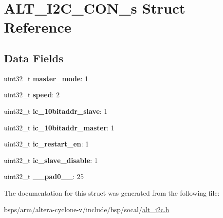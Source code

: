 \hypertarget{structALT__I2C__CON__s}{}\section{A\+L\+T\+\_\+\+I2\+C\+\_\+\+C\+O\+N\+\_\+s Struct Reference}
\label{structALT__I2C__CON__s}
\subsection*{Data Fields}
\begin{DoxyCompactItemize}
\item 
\mbox{\label{structALT__I2C__CON__s_adaf6b8d0719f32b789cf86f8646d826a}} 
uint32\+\_\+t {\bfseries master\+\_\+mode}\+: 1
\item 
\mbox{\label{structALT__I2C__CON__s_a8f0bcf93c2d296f9950137e7461b5cda}} 
uint32\+\_\+t {\bfseries speed}\+: 2
\item 
\mbox{\label{structALT__I2C__CON__s_a58046a9ebf05bc591433ba9f84b34a2a}} 
uint32\+\_\+t {\bfseries ic\+\_\+10bitaddr\+\_\+slave}\+: 1
\item 
\mbox{\label{structALT__I2C__CON__s_afe18a5780643bbc074b2d28fe41c19fc}} 
uint32\+\_\+t {\bfseries ic\+\_\+10bitaddr\+\_\+master}\+: 1
\item 
\mbox{\label{structALT__I2C__CON__s_aeeb8bd4a07ff1e2fa544bc58a1a0398c}} 
uint32\+\_\+t {\bfseries ic\+\_\+restart\+\_\+en}\+: 1
\item 
\mbox{\label{structALT__I2C__CON__s_af79100ce99385f60e8e5d268c51c9caf}} 
uint32\+\_\+t {\bfseries ic\+\_\+slave\+\_\+disable}\+: 1
\item 
\mbox{\label{structALT__I2C__CON__s_a7779951f060ce70be864d88c9b7006c6}} 
uint32\+\_\+t {\bfseries \+\_\+\+\_\+pad0\+\_\+\+\_\+}\+: 25
\end{DoxyCompactItemize}


The documentation for this struct was generated from the following file\+:\begin{DoxyCompactItemize}
\item 
bsps/arm/altera-\/cyclone-\/v/include/bsp/socal/\mbox{\hyperlink{socal_2alt__i2c_8h}{alt\+\_\+i2c.\+h}}\end{DoxyCompactItemize}
